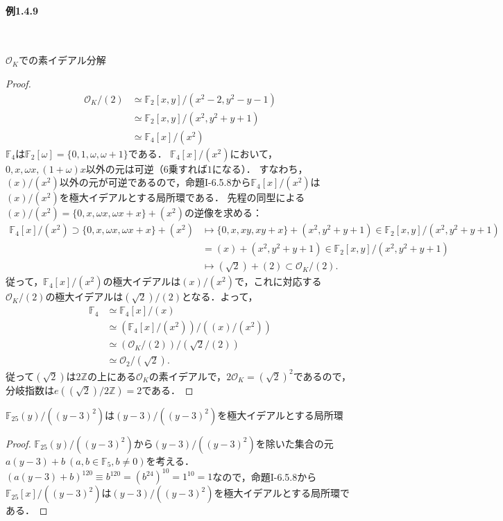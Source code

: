 \paragraph{例1.4.9}~
\begin{screen}
  $\mathcal{O}_K$での素イデアル分解
\end{screen}
\begin{proof}
  \begin{align*}
    \mathcal{O}_K/(2) &\simeq \mathbb{F}_2[x, y]/(x^2-2, y^2-y-1) \\
    &\simeq \mathbb{F}_2[x, y]/(x^2, y^2 + y + 1) \\
    &\simeq\mathbb{F}_4[x]/(x^2)
  \end{align*}
  $\mathbb{F}_4$は$\mathbb{F}_2[\omega] = \{0, 1, \omega, \omega + 1\}$である．
  $\mathbb{F}_4[x]/(x^2)$において，$0, x, \omega x, (1 + \omega)x$以外の元は可逆（6乗すれば$1$になる）．
  すなわち，$(x)/(x^2)$以外の元が可逆であるので，命題I-6.5.8から$\mathbb{F}_4[x]/(x^2)$は$(x)/(x^2)$を極大イデアルとする局所環である．
  先程の同型による$(x)/(x^2) = \{0, x, \omega x, \omega x + x\} + (x^2)$の逆像を求める：
  \begin{align*}
    \mathbb{F}_4[x]/(x^2) \supset \{0, x, \omega x, \omega x + x\} + (x^2) &\mapsto \{0, x, xy, xy + x\} + (x^2, y^2 + y + 1) \in \mathbb{F}_2[x, y]/(x^2, y^2 + y + 1) \\
    & =  (x) + (x^2, y^2 + y + 1) \in \mathbb{F}_2[x, y]/(x^2, y^2 + y + 1) \\
    &\mapsto (\sqrt{2}) + (2) \subset \mathcal{O}_K/(2).
  \end{align*}
  従って，$\mathbb{F}_4[x]/(x^2)$の極大イデアルは$(x)/(x^2)$で，これに対応する$\mathcal{O}_K/(2)$の極大イデアルは$(\sqrt{2})/(2)$となる．よって，
  \begin{align*}
    \mathbb{F}_4 &\simeq \mathbb{F}_4[x]/(x) \\
    &\simeq (\mathbb{F}_4[x]/(x^2))/((x)/(x^2)) \\
    &\simeq (\mathcal{O}_K/(2))/(\sqrt{2}/(2)) \\
    &\simeq \mathcal{O}_2/(\sqrt{2}).
  \end{align*}
  従って$(\sqrt{2})$は$2\mathbb{Z}$の上にある$\mathcal{O}_K$の素イデアルで，$2\mathcal{O}_K = (\sqrt{2})^2$であるので，分岐指数は$e((\sqrt{2})/2\mathbb{Z}) = 2$である．
\end{proof}

\begin{screen}
  $\mathbb{F}_{25}(y)/((y-3)^2)$は$(y-3)/((y-3)^2)$を極大イデアルとする局所環
\end{screen}
\begin{proof}
  $\mathbb{F}_{25}(y)/((y-3)^2)$から$(y-3)/((y-3)^2)$を除いた集合の元$a(y-3) + b\ (a, b\in\mathbb{F}_5, b\neq 0)$を考える．
  $(a(y-3) + b)^{120}\equiv b^{120} = (b^{24})^{10} = 1^{10} = 1$なので，命題I-6.5.8から$\mathbb{F}_{25}[x]/((y-3)^2)$は$(y-3)/((y-3)^2)$を極大イデアルとする局所環である．
\end{proof}


